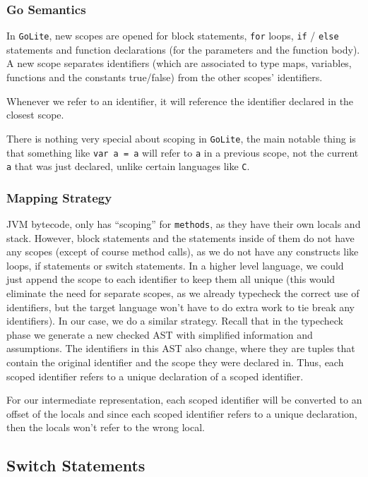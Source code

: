 \documentclass[11pt]{article}
\begin{document}
\subsubsection{Go Semantics}
\label{sec:orgcee10e1}
In \texttt{GoLite}, new scopes are opened for block statements, \texttt{for}
loops, \texttt{if} / \texttt{else} statements and function declarations (for the
parameters and the function body). A new scope separates
identifiers (which are associated to type maps, variables,
functions and the constants true/false) from the other scopes'
identifiers.

Whenever we refer to an identifier, it will reference the
identifier declared in the closest scope.

There is nothing very special about scoping in \texttt{GoLite}, the main
notable thing is that something like \texttt{var a = a} will refer to \texttt{a}
in a previous scope, not the current \texttt{a} that was just declared,
unlike certain languages like \texttt{C}.
\subsubsection{Mapping Strategy}
\label{sec:org1e0b63b}
JVM bytecode, only has ``scoping'' for \texttt{methods}, as they have
their own locals and stack. However, block statements and the
statements inside of them do not have any scopes (except of course
method calls), as we do not have any constructs like loops, if
statements or switch statements. In a higher level language, we
could just append the scope to each identifier to keep them all
unique (this would eliminate the need for separate scopes, as we
already typecheck the correct use of identifiers, but the target
language won't have to do extra work to tie break any
identifiers). In our case, we do a similar strategy. Recall that
in the typecheck phase we generate a new checked AST with
simplified information and assumptions. The identifiers in this
AST also change, where they are tuples that contain the original
identifier and the scope they were declared in. Thus, each scoped
identifier refers to a unique declaration of a scoped identifier.

For our intermediate representation, each scoped identifier will
be converted to an offset of the locals and since each scoped
identifier refers to a unique declaration, then the locals won't
refer to the wrong local.
\subsection{Switch Statements}
\label{sec:orga66951d}
\end{document}

